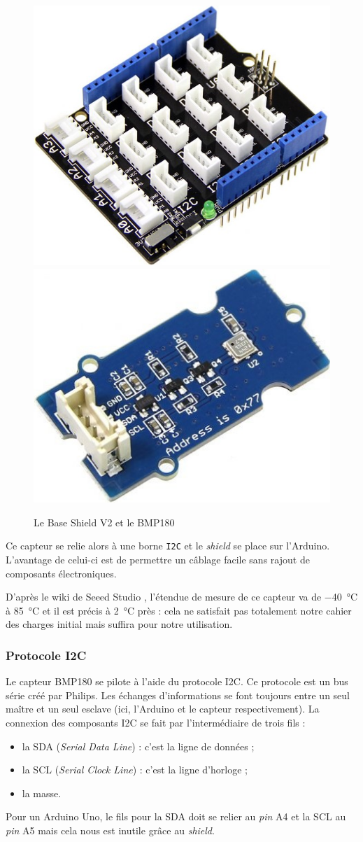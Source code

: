 \begin{figure}
	\centering
	\includegraphics[width=.4\linewidth]{Images/Base_Shield}
	\hspace{.1\linewidth}
	\includegraphics[width=.4\linewidth]{Images/BMP180}
	\caption{Le Base Shield V2 et le BMP180}
\end{figure}

Ce capteur se relie alors à une borne \verb-I2C- et le \emph{shield} se place sur l'Arduino. L'avantage de celui-ci est de permettre un câblage facile sans rajout de composants électroniques.

D'après le wiki de Seeed Studio \cite{wiki:capteur}, l'étendue de mesure de ce capteur va de \SI{-40}{\celsius} à \SI{85}{\celsius} et il est précis à \SI{2}{\celsius} près : cela ne satisfait pas totalement notre cahier des charges initial mais suffira pour notre utilisation.

\subsubsection{Protocole I\up 2C}

Le capteur BMP180 se pilote à l'aide du protocole I\up 2C. Ce protocole est un bus série créé par Philips. Les échanges d'informations se font toujours entre un seul maître et un seul esclave (ici, l'Arduino et le capteur respectivement). La connexion des composants I\up 2C se fait par l'intermédiaire de trois fils :
\begin{itemize}
	\item la SDA (\emph{Serial Data Line}) : c'est la ligne de données ;
	\item la SCL (\emph{Serial Clock Line}) : c'est la ligne d'horloge ;
	\item la masse.
\end{itemize}
Pour un Arduino Uno, le fils pour la SDA doit se relier au \emph{pin} A4 et la SCL au \emph{pin} A5 mais cela nous est inutile grâce au \emph{shield}.

